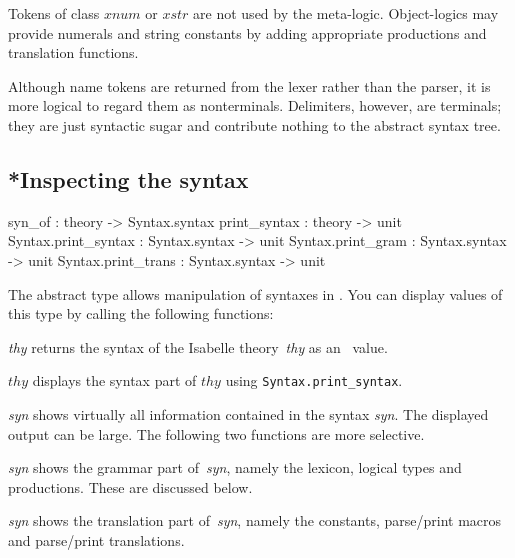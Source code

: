 Tokens of class $xnum$ or $xstr$ are not used by the meta-logic.
Object-logics may provide numerals and string constants by adding appropriate
productions and translation functions.

\medskip
Although name tokens are returned from the lexer rather than the parser, it
is more logical to regard them as nonterminals.  Delimiters, however, are
terminals; they are just syntactic sugar and contribute nothing to the
abstract syntax tree.


\subsection{*Inspecting the syntax}
\begin{ttbox}
syn_of              : theory -> Syntax.syntax
print_syntax        : theory -> unit
Syntax.print_syntax : Syntax.syntax -> unit
Syntax.print_gram   : Syntax.syntax -> unit
Syntax.print_trans  : Syntax.syntax -> unit
\end{ttbox}
The abstract type  allows manipulation of syntaxes
in \ML.  You can display values of this type by calling the following
functions:
\begin{ttdescription}
\item[\ttindexbold{syn_of} {\it thy}] returns the syntax of the Isabelle
  theory~{\it thy} as an \ML\ value.

\item[\ttindexbold{print_syntax} $thy$] displays the syntax part of $thy$
  using {\tt Syntax.print_syntax}.

\item[\ttindexbold{Syntax.print_syntax} {\it syn}] shows virtually all
  information contained in the syntax {\it syn}.  The displayed output can
  be large.  The following two functions are more selective.

\item[\ttindexbold{Syntax.print_gram} {\it syn}] shows the grammar part
  of~{\it syn}, namely the lexicon, logical types and productions.  These are
  discussed below.

\item[\ttindexbold{Syntax.print_trans} {\it syn}] shows the translation
  part of~{\it syn}, namely the constants, parse/print macros and
  parse/print translations.
\end{ttdescription}


